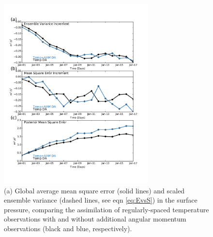  \begin{figure}
	 \includegraphics[width=0.7\textwidth]{Paper_figures/ERPDA_paper_MSE_RST_vs_ERPRST_global.pdf}
	 \caption{(a) Global average mean square error (solid lines) and scaled ensemble variance (dashed lines, see eqn \ref{eq:EvsS}) in the surface pressure, comparing the assimilation of regularly-spaced temperature observations with and without additional angular momentum observations (black and blue, respectively).}
	 \label{fig:added_value_MSE}
\end{figure}

